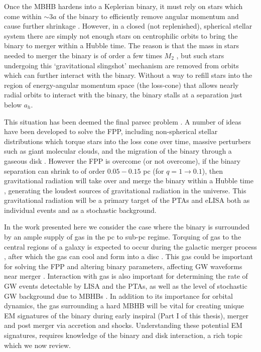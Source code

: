 Once the MBHB hardens into a Keplerian binary, it must rely on stars which
come within $\sim3a$ of the binary to efficiently remove angular momentum and
cause further shrinkage \citep{Saslaw:1974}. However, in a closed (not
replenished),  spherical stellar system there are simply not enough stars on
centrophilic orbits to bring the binary to merger within a Hubble time. The
reason is that the mass in stars needed to merger the binary is of order a few
times $M_2$ \citep{MerrittMilos:2005:LRR}, but such stars undergoing this
`gravitational slingshot' mechanism are removed from orbits which can further
interact with the binary. Without a way to refill stars into the region of
energy-angular momentum space (the loss-cone) that allows nearly radial orbits
to interact with the binary, the binary stalls at a separation just below
$a_h$.

This situation has been deemed the final parsec problem
\citep[FPP][]{Milosavljevic:2003:FPcP}. A number of ideas have been developed
to solve the FPP, including non-spherical stellar distributions which torque
stars into the loss cone over time, massive perturbers such as giant molecular
clouds, and the migration of the binary through a gaseous disk
\citep{Goicovic:2016, GouldRix:2000, ArmNat:2002:ApJL}.  However the FPP is
overcome (or not overcome), if the binary separation can shrink to of order
$0.05-0.15$ pc (for $q=1 \rightarrow 0.1$), then gravitational radiation will
take over and merge the binary within a Hubble time \citep{Peters64},
generating the loudest sources of gravitational radiation in the universe.
This gravitational radiation will be a primary target of the PTAs and eLISA
both as individual events and as a stochastic background.

In the work presented here we consider the case where the binary is surrounded
by an ample supply of gas in the pc to sub-pc regime. Torquing of gas to the
central regions of a galaxy is expected to occur during the galactic merger
process \citep{BH1992, Barnes:1996}, after which the gas can cool and form
into a disc \citep{Barnes:2002}. This gas could be important for solving the
FPP and altering binary parameters, affecting GW waveforms near merger
\citep[\emph{e.g.}][]{ArmNat:2005, YKH:2011:L, RoedigSesana:2012:eccGWs}.
Interaction with gas is also important for determining the rate of GW events
detectable by LISA and the PTAs, as well as the level of stochastic GW
background due to MBHBs \citep{KocsisSesana:2011, Shannon:2015,
Sesana+2016:GWB, EPTA:GWB:2015, Arzoumanian:2015:SGWB}. In addition to its
importance for orbital dynamics, the gas surrounding a hard MBHB will be vital
for creating unique EM signatures of the binary during early inspiral (Part I
of this thesis), merger \citep{Chang:2010, Baruteau:2012,
CerioliLodato:Squeeze:2016} and post merger \citep{Lippai:2008, Lia10,
Rossi:2010, Ponce:2012, Rosotti:2012, Zanotti:2012} via accretion and shocks.
Understanding these potential EM signatures, requires knowledge of the binary
and disk interaction, a rich topic which we now review.




